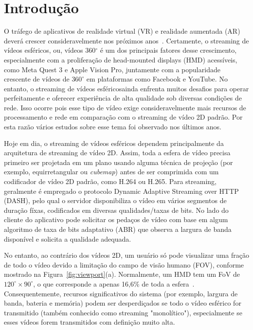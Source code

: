 \chapter{Introdução}\label{Cap:Introduction}
	

O tráfego de aplicativos de realidade virtual (VR) e realidade aumentada (AR) deverá crescer consideravelmente nos próximos anos~\cite{Cisco2020}. Certamente, o streaming de vídeos esféricos, ou, vídeos 360$^\circ$ é um dos principais fatores desse crescimento, especialmente com a proliferação de head-mounted displays (HMD) acessíveis, como Meta Quest 3 e Apple Vision Pro, juntamente com a popularidade crescente de vídeos de $360^\circ$ em plataformas como Facebook e YouTube. No entanto, o streaming de vídeos esféricosainda enfrenta muitos desafios para operar perfeitamente e oferecer experiência de alta qualidade sob diversas condições de rede. Isso ocorre pois esse tipo de vídeo exige consideravelmente mais recursos de processamento e rede em comparação com o streaming de vídeo 2D padrão. Por esta razão vários estudos sobre esse tema foi observado nos últimos anos. 

Hoje em dia, o streaming de vídeos esféricos dependem principalmente da arquitetura de streaming de vídeo 2D. Assim, toda a esfera de vídeo precisa primeiro ser projetada em um plano usando alguma técnica de projeção (por exemplo, equirretangular ou \textit{cubemap}) antes de ser comprimida com um codificador de vídeo 2D padrão, como H.264 ou H.265. 
Para streaming, geralmente é empregado o protocolo Dynamic Adaptive Streaming over HTTP (DASH), pelo qual o servidor disponibiliza o vídeo em vários segmentos de duração fíxas, codificados em diversas qualidades/taxas de bits. No lado do cliente do aplicativo pode solicitar os pedaços de vídeo com base em algum algoritmo de taxa de bits adaptativo (ABR) que observa a largura de banda disponível e solicita a qualidade adequada. 

No entanto, ao contrário dos vídeos 2D, um usuário só pode visualizar uma fração de todo o vídeo devido a limitação do campo de visão humano (FOV), conforme mostrado na Figura~\ref{fig:viewport}(a). Normalmente, um HMD tem um FoV de $120^{\circ}\times90^{\circ}$, o que corresponde a apenas 16,6\% de toda a esfera~\cite{Afzal2017}. Consequentemente, recursos significativos do sistema (por exemplo, largura de banda, bateria e memória) podem ser desperdiçados se todo o vídeo esférico for transmitido (também conhecido como streaming "monolítico"), especialmente se esses vídeos forem transmitidos com definição muito alta.

